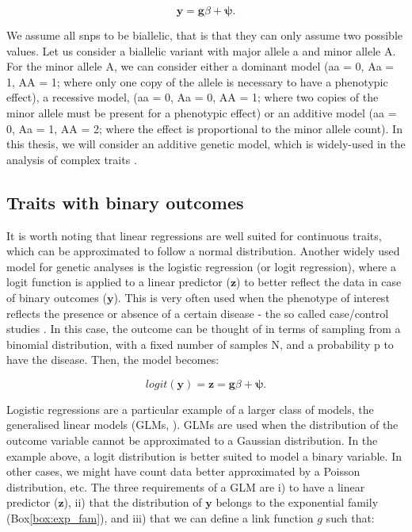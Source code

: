\begin{equation}\label{eq:Linear_regression_genetics}
 \mathbf{y} = \mathbf{g}\beta + \boldsymbol{\psi}. 
\end{equation}

We assume all \gls{snp}s to be biallelic, that is that they can only assume two possible values. 
Let us consider a biallelic variant with major allele a and minor allele A. For the minor allele A, we can consider either a dominant model (aa = 0, Aa = 1, AA = 1; where only one copy of the allele is necessary to have a phenotypic effect), a recessive model, (aa = 0, Aa = 0, AA = 1; where two copies of the minor allele must be present for a phenotypic effect) or an additive model (aa = 0, Aa = 1, AA = 2; where the effect is proportional to the minor allele count). 
In this thesis, we will consider an additive genetic model, which is widely-used in the analysis of complex traits \cite{laird2010fundamentals}.

\subsection{Traits with binary outcomes}

It is worth noting that linear regressions are well suited for continuous traits, which can be approximated to follow a normal distribution. 
Another widely used model for genetic analyses is the logistic regression (or logit regression), where a logit function is applied to a linear predictor ($\mathbf{z}$) to better reflect the data in case of binary outcomes ($\mathbf{y}$). 
This is very often used when the phenotype of interest reflects the presence or absence of a certain disease - the so called case/control studies \cite{chen2001general,clayton2013statistical}.
In this case, the outcome can be thought of in terms of sampling from a binomial distribution, with a fixed number of samples N, and a probability p to have the disease. 
Then, the model becomes:

\begin{equation}\label{eq:Logistic_regression_genetics_z}
 logit(\mathbf{y}) = \mathbf{z} = \mathbf{g}\beta + \boldsymbol{\psi}. 
\end{equation}

Logistic regressions are a particular example of a larger class of models, the generalised linear models (GLMs, \cite{mccullagh2018generalized}). 
GLMs are used when the distribution of the outcome variable cannot be approximated to a Gaussian distribution. 
In the example above, a logit distribution is better suited to model a binary variable. 
In other cases, we might have count data better approximated by a Poisson distribution, etc.
The three requirements of a GLM are i) to have a linear predictor ($\mathbf{z}$), ii) that the distribution of $\mathbf{y}$  belongs to the exponential family (Box\ref{box:exp_fam}), and iii) that we can define a link function $g$ such that:

